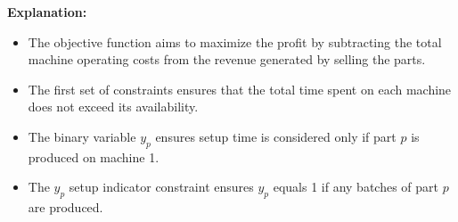 \documentclass{article}
\begin{document}
\textbf{Explanation:}
\begin{itemize}
    \item The objective function aims to maximize the profit by subtracting the total machine operating costs from the revenue generated by selling the parts.
    \item The first set of constraints ensures that the total time spent on each machine does not exceed its availability.
    \item The binary variable \(y_p\) ensures setup time is considered only if part \(p\) is produced on machine 1.
    \item The \(y_p\) setup indicator constraint ensures \(y_p\) equals 1 if any batches of part \(p\) are produced.
\end{itemize}
\end{document}
